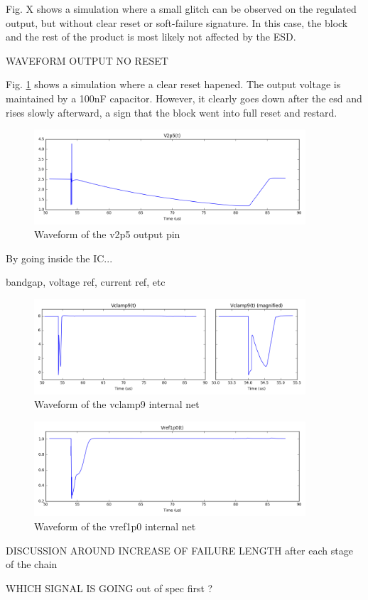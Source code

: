 Fig. X shows a simulation where a small glitch can be observed on the regulated output, but without clear reset or soft-failure signature.
In this case, the block and the rest of the product is most likely not affected by the ESD.

WAVEFORM OUTPUT NO RESET

Fig. \ref{fig:wvf-v2p5} shows a simulation where a clear reset hapened.
The output voltage is maintained by a 100nF capacitor.
However, it clearly goes down after the \gls{esd} and rises slowly afterward, a sign that the block went into full reset and restard.

\begin{figure}[!htbp]
  \centering
  \includegraphics[width=0.9\textwidth]{src/3/figures/v2p5.png}
  \caption{Waveform of the v2p5 output pin}
  \label{fig:wvf-v2p5}
\end{figure}

By going inside the \gls{IC}...

bandgap, voltage ref, current ref, etc

\begin{figure}[!htbp]
  \centering
  \includegraphics[width=0.9\textwidth]{src/3/figures/vclamp9.png}
  \caption{Waveform of the vclamp9 internal net}
  \label{fig:wvf-vclamp9}
\end{figure}

\begin{figure}[!htbp]
  \centering
  \includegraphics[width=0.9\textwidth]{src/3/figures/v1p0.png}
  \caption{Waveform of the vref1p0 internal net}
  \label{fig:wvf-v1p0}
\end{figure}

DISCUSSION AROUND INCREASE OF FAILURE LENGTH after each stage of the chain

WHICH SIGNAL IS GOING out of spec first ?
